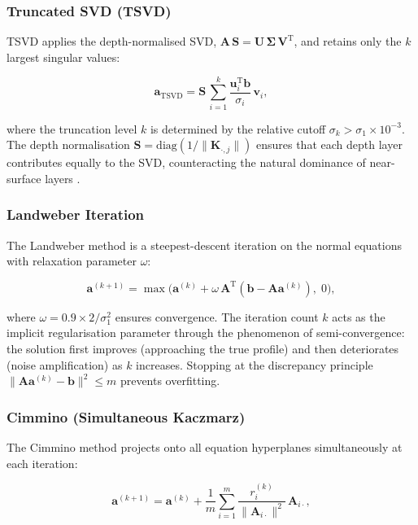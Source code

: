 \documentclass[a4paper,11pt]{article}
\begin{document}
\subsubsection{Truncated SVD (TSVD)}

TSVD applies the depth-normalised SVD, $\bm{A}\,\bm{S} = \bm{U}\,\bm{\Sigma}\,\bm{V}^\mathrm{T}$,
and retains only the $k$ largest singular values:

\begin{equation}
  \bm{a}_{\mathrm{TSVD}} = \bm{S}\,\sum_{i=1}^{k}
  \frac{\bm{u}_i^\mathrm{T}\bm{b}}{\sigma_i}\,\bm{v}_i,
\end{equation}

where the truncation level $k$ is determined by the relative cutoff
$\sigma_k > \sigma_1 \times 10^{-3}$.  The depth normalisation
$\bm{S} = \mathrm{diag}(1/\|\bm{K}_{\cdot,j}\|)$ ensures that each depth
layer contributes equally to the SVD, counteracting the natural dominance
of near-surface layers \citep{li19963d}.

\subsubsection{Landweber Iteration}

The Landweber method is a steepest-descent iteration on the normal
equations with relaxation parameter $\omega$:

\begin{equation}
  \bm{a}^{(k+1)} = \max\!\bigl(\bm{a}^{(k)} + \omega\,\bm{A}^\mathrm{T}(\bm{b} - \bm{A}\bm{a}^{(k)}),\; 0\bigr),
\end{equation}

where $\omega = 0.9 \times 2/\sigma_1^2$ ensures convergence.  The iteration
count $k$ acts as the implicit regularisation parameter through the
phenomenon of semi-convergence: the solution first improves (approaching
the true profile) and then deteriorates (noise amplification) as
$k$ increases.  Stopping at the discrepancy principle
$\|\bm{A}\bm{a}^{(k)} - \bm{b}\|^2 \leq m$ prevents overfitting.

\subsubsection{Cimmino (Simultaneous Kaczmarz)}

The Cimmino method projects onto all equation hyperplanes simultaneously
at each iteration:

\begin{equation}
  \bm{a}^{(k+1)} = \bm{a}^{(k)} + \frac{1}{m}
    \sum_{i=1}^{m} \frac{r_i^{(k)}}{\|\bm{A}_{i\cdot}\|^2}\,\bm{A}_{i\cdot},
\end{equation}
\end{document}
